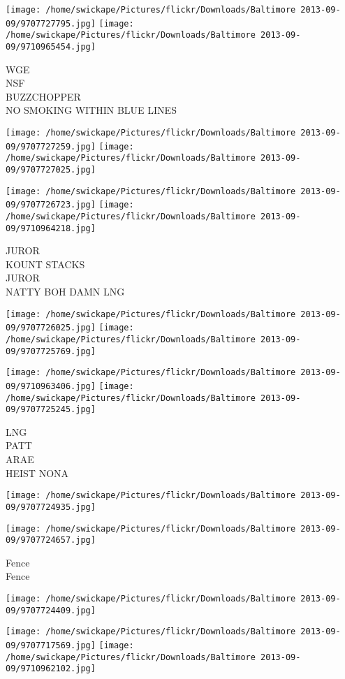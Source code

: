 \documentclass[10pt,letterpaper]{article}
\begin{document}
\texttt{[image: /home/swickape/Pictures/flickr/Downloads/Baltimore 2013-09-09/9707727795.jpg]}
\texttt{[image: /home/swickape/Pictures/flickr/Downloads/Baltimore 2013-09-09/9710965454.jpg]}

WGE\\
NSF\\
BUZZCHOPPER\\
NO SMOKING WITHIN BLUE LINES
\pagebreak

\texttt{[image: /home/swickape/Pictures/flickr/Downloads/Baltimore 2013-09-09/9707727259.jpg]}
\texttt{[image: /home/swickape/Pictures/flickr/Downloads/Baltimore 2013-09-09/9707727025.jpg]}

\texttt{[image: /home/swickape/Pictures/flickr/Downloads/Baltimore 2013-09-09/9707726723.jpg]}
\texttt{[image: /home/swickape/Pictures/flickr/Downloads/Baltimore 2013-09-09/9710964218.jpg]}

JUROR\\
KOUNT STACKS\\
JUROR\\
NATTY BOH DAMN LNG
\pagebreak

\texttt{[image: /home/swickape/Pictures/flickr/Downloads/Baltimore 2013-09-09/9707726025.jpg]}
\texttt{[image: /home/swickape/Pictures/flickr/Downloads/Baltimore 2013-09-09/9707725769.jpg]}

\texttt{[image: /home/swickape/Pictures/flickr/Downloads/Baltimore 2013-09-09/9710963406.jpg]}
\texttt{[image: /home/swickape/Pictures/flickr/Downloads/Baltimore 2013-09-09/9707725245.jpg]}

LNG\\
PATT\\
ARAE\\
HEIST NONA
\pagebreak

\texttt{[image: /home/swickape/Pictures/flickr/Downloads/Baltimore 2013-09-09/9707724935.jpg]}

\vspace{0.25in}
\texttt{[image: /home/swickape/Pictures/flickr/Downloads/Baltimore 2013-09-09/9707724657.jpg]}

Fence\\
Fence
\pagebreak

\texttt{[image: /home/swickape/Pictures/flickr/Downloads/Baltimore 2013-09-09/9707724409.jpg]}

\vspace{0.25in}
\texttt{[image: /home/swickape/Pictures/flickr/Downloads/Baltimore 2013-09-09/9707717569.jpg]}
\texttt{[image: /home/swickape/Pictures/flickr/Downloads/Baltimore 2013-09-09/9710962102.jpg]}
\end{document}

